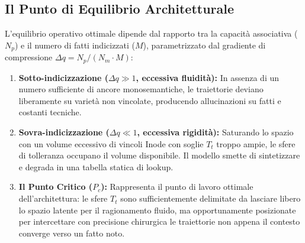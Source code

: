 \documentclass[11pt,a4paper]{article}
\theoremstyle{definition}
\begin{document}
\subsection{Il Punto di Equilibrio Architetturale}

L'equilibrio operativo ottimale dipende dal rapporto tra la capacità associativa ($N_p$) e il numero di fatti indicizzati ($M$), parametrizzato dal gradiente di compressione $\Delta q = N_p / (N_m \cdot M)$:

\begin{enumerate}[leftmargin=*, itemsep=2.0pt]
    \item \textbf{Sotto-indicizzazione ($\Delta q \gg 1$, eccessiva fluidità):} In assenza di un numero sufficiente di ancore monosemantiche, le traiettorie deviano liberamente su varietà non vincolate, producendo allucinazioni su fatti e costanti tecniche.
    \item \textbf{Sovra-indicizzazione ($\Delta q \ll 1$, eccessiva rigidità):} Saturando lo spazio con un volume eccessivo di vincoli Inode con soglie $T_t$ troppo ampie, le sfere di tolleranza occupano il volume disponibile. Il modello smette di sintetizzare e degrada in una tabella statica di lookup.
    \item \textbf{Il Punto Critico ($P_c$):} Rappresenta il punto di lavoro ottimale dell'architettura: le sfere $T_t$ sono sufficientemente delimitate da lasciare libero lo spazio latente per il ragionamento fluido, ma opportunamente posizionate per intercettare con precisione chirurgica le traiettorie non appena il contesto converge verso un fatto noto.
\end{enumerate}
\end{document}
